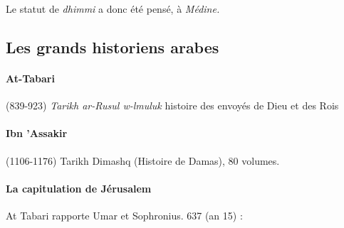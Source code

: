  Le statut de \textit{dhimmi} a donc été pensé, à \textit{Médine.}

 \subsection{Les grands historiens arabes}

 \paragraph{At-Tabari} (839-923) \textit{Tarikh ar-Rusul w-lmuluk} histoire des envoyés de Dieu et des Rois

 \paragraph{Ibn 'Assakir} (1106-1176) Tarikh Dimashq (Histoire de Damas), 80 volumes. 


\paragraph{La capitulation de Jérusalem} At Tabari rapporte Umar et Sophronius. 
 637 (an 15) : 
 
